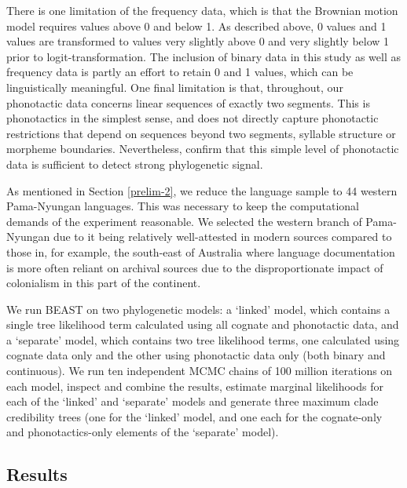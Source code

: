 \documentclass[]{article}
\begin{document}
There is one limitation of the frequency data, which is that the Brownian motion model requires values above 0 and below 1. As described above, 0 values and 1 values are transformed to values very slightly above 0 and very slightly below 1 prior to logit-transformation. The inclusion of binary data in this study as well as frequency data is partly an effort to retain 0 and 1 values, which can be linguistically meaningful. One final limitation is that, throughout, our phonotactic data concerns linear sequences of exactly two segments. This is phonotactics in the simplest sense, and does not directly capture phonotactic restrictions that depend on sequences beyond two segments, syllable structure or morpheme boundaries. Nevertheless, \textcite{macklin-cordes_phylogenetic_2020} confirm that this simple level of phonotactic data is sufficient to detect strong phylogenetic signal.

As mentioned in Section \ref{prelim-2}, we reduce the language sample to 44 western Pama-Nyungan languages. This was necessary to keep the computational demands of the experiment reasonable. We selected the western branch of Pama-Nyungan due to it being relatively well-attested in modern sources compared to those in, for example, the south-east of Australia where language documentation is more often reliant on archival sources due to the disproportionate impact of colonialism in this part of the continent.

We run BEAST on two phylogenetic models: a `linked' model, which contains a single tree likelihood term calculated using all cognate and phonotactic data, and a `separate' model, which contains two tree likelihood terms, one calculated using cognate data only and the other using phonotactic data only (both binary and continuous). We run ten independent MCMC chains of 100 million iterations on each model, inspect and combine the results, estimate marginal likelihoods for each of the `linked' and `separate' models and generate three maximum clade credibility trees (one for the `linked' model, and one each for the cognate-only and phonotactics-only elements of the `separate' model).

\hypertarget{main-results}{%
\subsection{Results}\label{main-results}}
\end{document}
